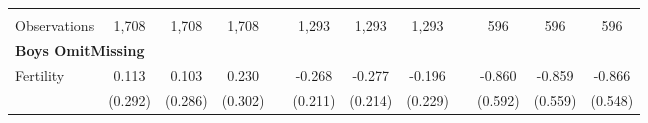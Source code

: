 \begin{landscape}
\begin{table}[htpb!]
\begin{center}
\begin{tabular}{lcccp{2mm}cccp{2mm}ccc}
\begin{footnotesize}\end{footnotesize}&\begin{footnotesize}\end{footnotesize}&\begin{footnotesize}\end{footnotesize}&\begin{footnotesize}\end{footnotesize}&\begin{footnotesize}\end{footnotesize}&\begin{footnotesize}\end{footnotesize}&\begin{footnotesize}\end{footnotesize}&\begin{footnotesize}\end{footnotesize}&\begin{footnotesize}\end{footnotesize}&\begin{footnotesize}\end{footnotesize}&\begin{footnotesize}\end{footnotesize}&\begin{footnotesize}\end{footnotesize}\\Observations&1,708&1,708&1,708&&1,293&1,293&1,293&&596&596&596\\
\multicolumn{12}{l}{\textbf{Boys OmitMissing}}\\ 
Fertility&0.113&0.103&0.230&&-0.268&-0.277&-0.196&&-0.860&-0.859&-0.866\\
&(0.292)&(0.286)&(0.302)&&(0.211)&(0.214)&(0.229)&&(0.592)&(0.559)&(0.548)\\

\end{tabular}
\end{center}
\end{table}
\end{landscape}
